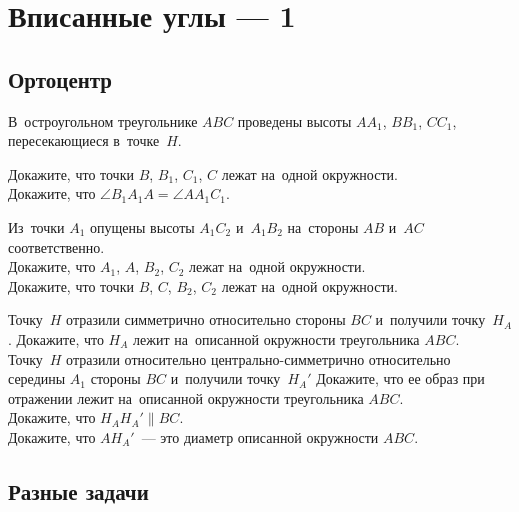 
\section*{Вписанные углы --- 1}


\subsection*{Ортоцентр}

В~остроугольном треугольнике $ABC$ проведены высоты $A A_1$, $B B_1$, $C C_1$,
пересекающиеся в~точке~$H$.

\begin{problems}

\item
\subproblem
Докажите, что точки $B$, $B_1$, $C_1$, $C$ лежат на~одной окружности.
\\
\subproblem
Докажите, что $\angle B_1 A_1 A = \angle A A_1 C_1$.

\item
Из~точки $A_1$ опущены высоты $A_1 C_2$ и~$A_1 B_2$ на~стороны $AB$ и~$AC$
соответственно.
\\
\subproblem
Докажите, что $A_1$, $A$, $B_2$, $C_2$ лежат на~одной окружности.
\\
\subproblem
Докажите, что точки $B$, $C$, $B_2$, $C_2$ лежат на~одной окружности.

\item
\subproblem
Точку~$H$ отразили симметрично относительно стороны $BC$ и~получили
точку~$H_{A}$.
Докажите, что $H_{A}$ лежит на~описанной окружности треугольника $ABC$.
\\
\subproblem
Точку~$H$ отразили относительно центрально-симметрично относительно середины
$A_1$ стороны $BC$ и~получили точку~$H_{A}'$
Докажите, что ее образ при отражении лежит на~описанной окружности
треугольника $ABC$.
\\
\subproblem
Докажите, что $H_{A} H_{A}' \parallel BC$.
\\
\subproblem
Докажите, что $A H_{A}'$~--- это диаметр описанной окружности $ABC$.

\end{problems}

\subsection*{Разные задачи}

